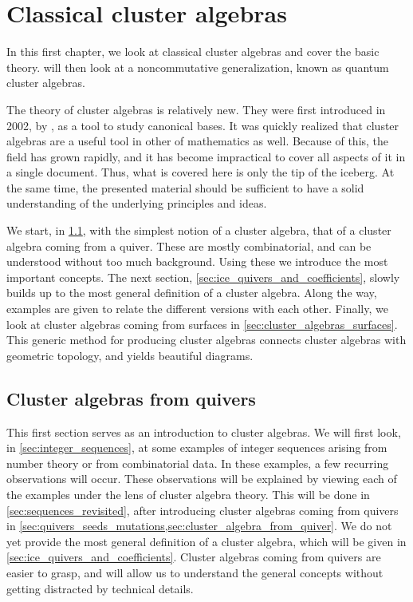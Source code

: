 \chapter{Classical cluster algebras}\label{sec:classical_cluster_algebras}
\chaptertoc

\noindent
In this first chapter, we look at classical cluster algebras and cover the basic theory.  will then look at a noncommutative generalization, known as quantum cluster algebras.

The theory of cluster algebras is relatively new. They were first introduced in 2002,
by \textcite{FominZelevinsky2002CAF}, as a tool to study canonical bases. It was
quickly realized that cluster algebras are a useful tool in other of mathematics as
well. Because of this, the field has grown rapidly, and it has become impractical to
cover all aspects of it in a single document. Thus, what is covered here is only the
tip of the iceberg. At the same time, the presented material should be sufficient to
have a solid understanding of the underlying principles and ideas.

We start, in \cref{sec:cluster_algebras_quivers}, with the simplest notion of a cluster
algebra, that of a cluster algebra coming from a quiver. These are mostly
combinatorial, and can be understood without too much background. Using these we
introduce the most important concepts. The next section,
\cref{sec:ice_quivers_and_coefficients}, slowly builds up to the most general
definition of a cluster algebra. Along the way, examples are given to relate the
different versions with each other. Finally, we look at cluster algebras coming from
surfaces in \cref{sec:cluster_algebras_surfaces}. This generic method for producing
cluster algebras connects cluster algebras with geometric topology, and yields
beautiful diagrams.

\section{Cluster algebras from quivers}\label{sec:cluster_algebras_quivers}

This first section serves as an introduction to cluster algebras. We will first look,
in \cref{sec:integer_sequences}, at some examples of integer sequences arising from
number theory or from combinatorial data. In these examples, a few recurring
observations will occur. These observations will be explained by viewing each of the
examples under the lens of cluster algebra theory. This will be done in
\cref{sec:sequences_revisited}, after introducing cluster algebras coming from quivers
in \cref{sec:quivers_seeds_mutations,sec:cluster_algebra_from_quiver}. We do not yet
provide the most general definition of a cluster algebra, which will be given in
\cref{sec:ice_quivers_and_coefficients}. Cluster algebras coming from quivers are
easier to grasp, and will allow us to understand the general concepts without getting
distracted by technical details.

